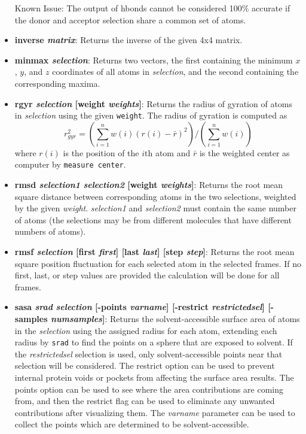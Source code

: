 \begin{itemize}
  Known Issue: The output of hbonds cannot be considered 100\% accurate if 
  the donor and acceptor selection share a common set of atoms.

\item {\bf inverse {\it matrix}}:
  Returns the inverse of the given 4x4 matrix.

\item {\bf minmax {\it selection}}:
  Returns two vectors, the first containing the minimum $x$, $y$, and $z$
  coordinates of all atoms in {\it selection}, and the second containing the
  corresponding maxima.

\item {\bf rgyr {\it selection} [weight {\it weights}]}:
  Returns the radius of gyration of atoms in {\it selection} using the
  given {\tt weight}.  The radius of gyration is computed as 
  \begin{equation}
  r_{gyr}^2 = \left( \sum_{i=1}^n w(i) (r(i) - \bar r)^2\right) / \left( \sum_{i=1}^n w(i)\right)
  \end{equation}
  where $r(i)$ is the position of the $i$th atom and $\bar r$ is the weighted 
  center as computer by {\tt measure center}.

\item {\bf rmsd {\it selection1} {\it selection2} [weight {\it weights}]}:
Returns the root mean square distance between corresponding atoms in
the two selections, weighted by the given {\it weight}.  {\it selection1} and
{\it selection2} must contain the same number of atoms (the selections may
be from different molecules that have different numbers of atoms).  

\item {\bf rmsf {\it selection} [first {\it first}] [last {\it last}] [step {\it step}]}:
Returns the root mean square position fluctuation for each selected 
atom in the selected frames.  If no first, last, or step values are 
provided the calculation will be done for all frames.

\item {\bf sasa {\it srad} {\it selection} [-points {\it varname}] [-restrict {\it restrictedsel}] [-samples {\it numsamples}]}:
  Returns the solvent-accessible surface area of atoms in the
  {\it selection} using the assigned radius for each atom, extending
  each radius by {\tt srad} to find the points on a sphere that are
  exposed to solvent.  If the {\it restrictedsel} selection is used,
  only solvent-accessible points near that selection will be considered.
  The restrict option can be used to prevent internal protein
  voids or pockets from affecting the surface area results.  The points
  option can be used to see where the area contributions are coming from,
  and then the restrict flag can be used to eliminate any unwanted
  contributions after visualizing them.  The {\it varname} parameter 
  can be used to collect the points which are determined to be 
  solvent-accessible.


\end{itemize}
